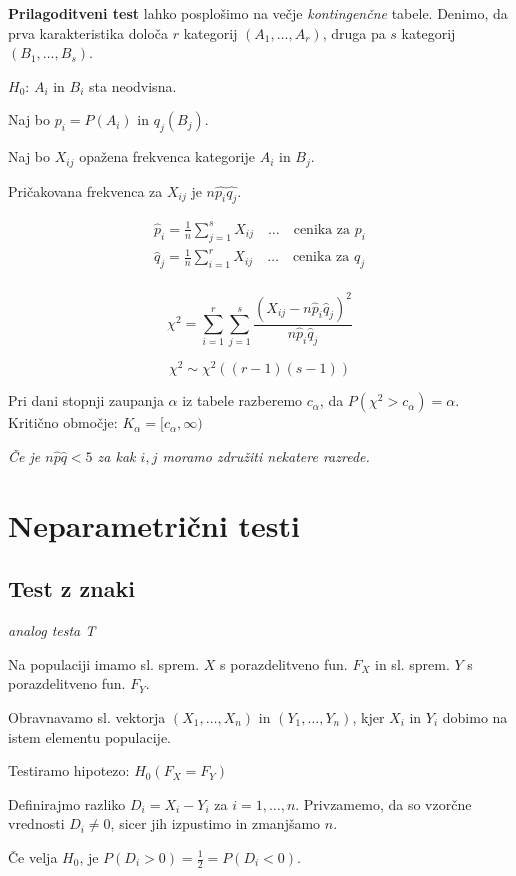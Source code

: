 \begin{multicols}{5}
\textbf{Prilagoditveni test} lahko posplošimo na večje \textit{kontingenčne} tabele. 
Denimo, da prva karakteristika določa $r$ kategorij $(A_1, \dots, A_r)$, druga pa $s$ kategorij $(B_1, \dots, B_s)$.

$H_0$: $A_i$ in $B_i$ sta neodvisna.

Naj bo $p_i = P(A_i)$ in $q_j(B_j)$.

Naj bo $X_{ij}$ opažena frekvenca kategorije $A_i$ in $B_j$.

Pričakovana frekvenca za $X_{ij}$ je $n\hat{p_i} \hat{q_j}$.

\begin{align*}
    \hat{p}_i = \frac{1}{n} \sum_{j=1}^s X_{ij} \quad \dots \quad \text{cenika za } p_i \\
    \hat{q}_j = \frac{1}{n} \sum_{i=1}^r X_{ij} \quad \dots \quad \text{cenika za } q_j \\
\end{align*}

\[ \chi^2 = \sum_{i=1}^r \sum_{j=1}^s \frac{(X_{ij} - n\hat{p}_i \hat{q}_j)^2}{n\hat{p}_i \hat{q}_j}\]

\[ \chi^2 \sim \chi^2((r-1)(s-1))\]

Pri dani stopnji zaupanja $\alpha$ iz tabele razberemo $c_\alpha$, da $P(\chi^2 > c_\alpha) = \alpha$. 
Kritično območje: $K_\alpha = [c_\alpha, \infty)$

\textit{Če je $n\hat{p}\hat{q} < 5$ za kak $i, j$ moramo združiti nekatere razrede.}

\section{Neparametrični testi}
\subsection{Test z znaki}
\textit{analog testa T}

Na populaciji imamo sl. sprem. $X$ s porazdelitveno fun. $F_X$ in sl. sprem. $Y$ s porazdelitveno fun. $F_Y$.

Obravnavamo sl. vektorja $(X_1, \dots, X_n)$ in $(Y_1, \dots, Y_n)$, kjer $X_i$ in $Y_i$ dobimo na istem elementu populacije.

Testiramo hipotezo: $H_0 (F_X = F_Y)$

Definirajmo razliko $D_i = X_i - Y_i$ za $i = 1,\dots , n$. Privzamemo, da so vzorčne vrednosti $D_i \neq 0$, sicer jih izpustimo in zmanjšamo $n$.

Če velja $H_0$, je $P(D_i > 0) = \frac{1}{2} = P(D_i < 0)$.


\end{multicols}
